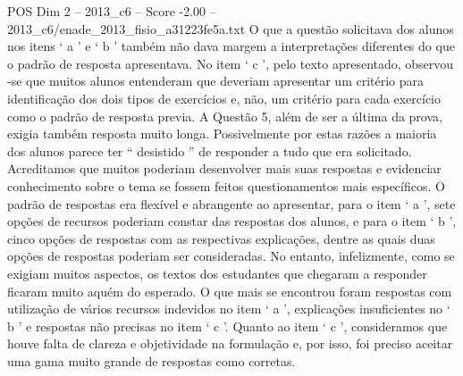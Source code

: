 \begin{textsample}{POS Dim 2 – 2013\_c6 – Score -2.00 – 2013\_c6/enade\_2013\_fisio\_a31223fe5a.txt}
O que a questão solicitava dos alunos nos itens ‘ a ’ e ‘ b ’ também não dava margem a interpretações diferentes do que o padrão de resposta apresentava.
No item ‘ c ’, pelo texto apresentado, observou -se que muitos alunos entenderam que deveriam apresentar um critério para identificação dos dois tipos de exercícios e, não, um critério para cada exercício como o padrão de resposta previa.
A Questão 5, além de ser a última da prova, exigia também resposta muito longa.
Possivelmente por estas razões a maioria dos alunos parece ter “ desistido ” de responder a tudo que era solicitado.
Acreditamos que muitos poderiam desenvolver mais suas respostas e evidenciar conhecimento sobre o tema se fossem feitos questionamentos mais específicos.
O padrão de respostas era flexível e abrangente ao apresentar, para o item ‘ a ’, sete opções de recursos poderiam constar das respostas dos alunos, e para o item ‘ b ’, cinco opções de respostas com as respectivas explicações, dentre as quais duas opções de respostas poderiam ser consideradas.
No entanto, infelizmente, como se exigiam muitos aspectos, os textos dos estudantes que chegaram a responder ficaram muito aquém do esperado.
O que mais se encontrou foram respostas com utilização de vários recursos indevidos no item ‘ a ’, explicações insuficientes no ‘ b ’ e respostas não precisas no item ‘ c ’.
Quanto ao item ‘ c ’, consideramos que houve falta de clareza e objetividade na formulação e, por isso, foi preciso aceitar uma gama muito grande de respostas como corretas.

\end{textsample}

